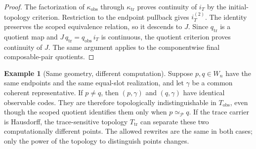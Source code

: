 \documentclass[10pt,reqno]{amsart}
\theoremstyle{definition}
\newtheorem{example}[definition]{Example}
\theoremstyle{plain}
\theoremstyle{remark}
\newcommand{\RwEq}{\mathrel{\simeq_{\!\mathcal P}}}
\begin{document}
\begin{proof}
The factorization of $\kappa_{\mathrm{obs}}$ through $\kappa_{\mathrm{tr}}$
proves continuity of $i_T$ by the initial-topology criterion.  Restriction to
the endpoint pullback gives $i_T^{(2)}$.  The identity preserves the scoped
equivalence relation, so it descends to $J$.  Since
$q_{\mathrm{tr}}$ is a quotient map and
$J\,q_{\mathrm{tr}}=q_{\mathrm{obs}}\,i_T$ is continuous, the quotient
criterion proves continuity of $J$.  The same argument applies to the
componentwise final composable-pair quotients.
\end{proof}

\begin{example}[Same geometry, different computation]
Suppose $p,q\in W_n$ have the same endpoints and the same equal-slot
realization, and let $\gamma$ be a common coherent representative.  If
$p\neq q$, then $(p,\gamma)$ and $(q,\gamma)$ have identical observable
codes.  They are therefore topologically indistinguishable in
$T_{\mathrm{obs}}$, even though the scoped quotient identifies them only when
$p\RwEq q$.  If the trace carrier is Hausdorff, the trace-sensitive topology
$T_{\mathrm{tr}}$ can separate these two computationally different points.
The allowed rewrites are the same in both cases; only the power of the
topology to distinguish points changes.
\end{example}
\end{document}
